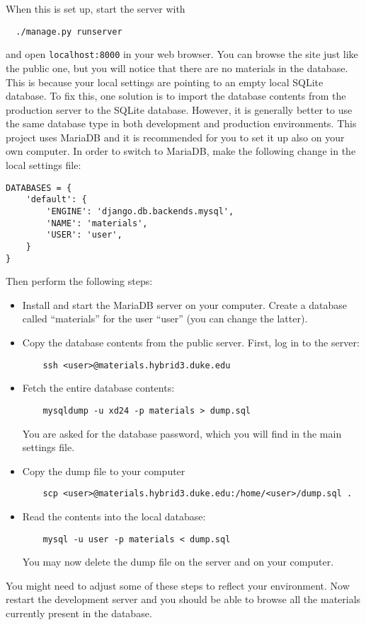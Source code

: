 \documentclass{article}
\begin{document}
When this is set up, start the server with
\begin{lstlisting}
  ./manage.py runserver
\end{lstlisting}
and open \verb+localhost:8000+ in your web browser. You can browse the site just like the public one, but you will notice that there are no materials in the database. This is because your local settings are pointing to an empty local SQLite database. To fix this, one solution is to import the database contents from the production server to the SQLite database. However, it is generally better to use the same database type in both development and production environments. This project uses MariaDB and it is recommended for you to set it up also on your own computer. In order to switch to MariaDB, make the following change in the local settings file:
\lstset{language=Python}
\begin{lstlisting}
DATABASES = {
    'default': {
        'ENGINE': 'django.db.backends.mysql',
        'NAME': 'materials',
        'USER': 'user',
    }
}
\end{lstlisting}
Then perform the following steps:
\begin{itemize}
\item Install and start the MariaDB server on your computer. Create a database called ``materials'' for the user ``user'' (you can change the latter).
\item Copy the database contents from the public server. First, log in to the server:
  \begin{lstlisting}
    ssh <user>@materials.hybrid3.duke.edu
  \end{lstlisting}
\item Fetch the entire database contents:
  \begin{lstlisting}
    mysqldump -u xd24 -p materials > dump.sql
  \end{lstlisting}
  You are asked for the database password, which you will find in the main settings file.
\item Copy the dump file to your computer
  \begin{lstlisting}
    scp <user>@materials.hybrid3.duke.edu:/home/<user>/dump.sql .
  \end{lstlisting}
\item Read the contents into the local database:
  \begin{lstlisting}
    mysql -u user -p materials < dump.sql
  \end{lstlisting}
  You may now delete the dump file on the server and on your computer.
\end{itemize}
You might need to adjust some of these steps to reflect your environment. Now restart the development server and you should be able to browse all the materials currently present in the database.
\end{document}
